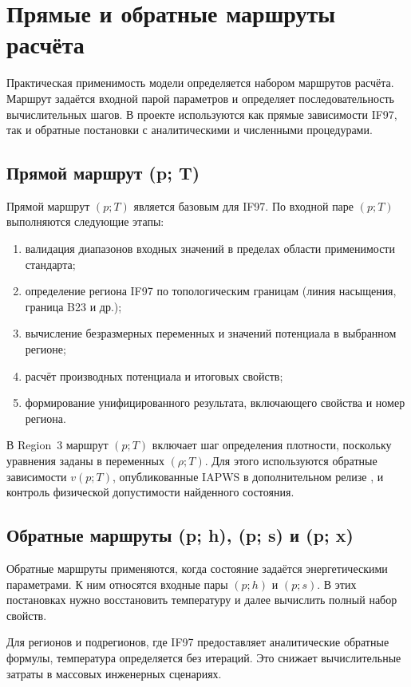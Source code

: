 \section{Прямые и обратные маршруты расчёта}

Практическая применимость модели определяется набором маршрутов расчёта.
Маршрут задаётся входной парой параметров
и определяет последовательность вычислительных шагов.
В проекте используются как прямые зависимости IF97,
так и обратные постановки с аналитическими и численными процедурами.

\subsection{Прямой маршрут (p; T)}

Прямой маршрут $(p; T)$ является базовым для IF97.
По входной паре $(p; T)$ выполняются следующие этапы:
\begin{enumerate}
\item валидация диапазонов входных значений в пределах области применимости стандарта;
\item определение региона IF97 по топологическим границам (линия насыщения, граница B23 и др.);
\item вычисление безразмерных переменных и значений потенциала в выбранном регионе;
\item расчёт производных потенциала и итоговых свойств;
\item формирование унифицированного результата, включающего свойства и номер региона.
\end{enumerate}

В Region~3 маршрут $(p; T)$ включает шаг определения плотности,
поскольку уравнения заданы в переменных $(\rho; T)$.
Для этого используются обратные зависимости $v(p; T)$,
опубликованные IAPWS в дополнительном релизе \cite{iapws_vpt_region3},
и контроль физической допустимости найденного состояния.

\subsection{Обратные маршруты (p; h), (p; s) и (p; x)}

Обратные маршруты применяются,
когда состояние задаётся энергетическими параметрами.
К ним относятся входные пары $(p; h)$ и $(p; s)$.
В этих постановках нужно восстановить температуру
и далее вычислить полный набор свойств.

Для регионов и подрегионов,
где IF97 предоставляет аналитические обратные формулы,
температура определяется без итераций.
Это снижает вычислительные затраты
в массовых инженерных сценариях.

